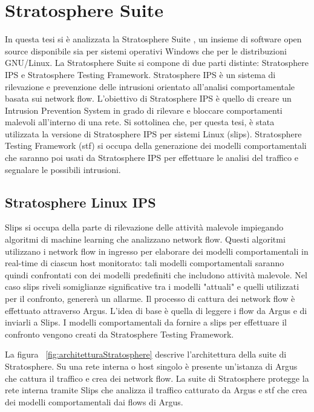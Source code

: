 \documentclass[../main.tex]{subfiles}
\begin{document}
\section{Stratosphere Suite}
In questa tesi si è analizzata la Stratosphere Suite \cite{stratosphereSuite}, un insieme di software open source disponibile sia per sistemi operativi Windows che per le distribuzioni GNU/Linux. La Stratosphere Suite si compone di due parti distinte: Stratosphere IPS e Stratosphere Testing Framework.
Stratosphere IPS è un sistema di rilevazione e prevenzione delle intrusioni orientato all'analisi comportamentale basata sui network flow. L'obiettivo di Stratosphere IPS è quello di creare un Intrusion Prevention System in grado di rilevare e bloccare comportamenti malevoli all'interno di una rete. Si sottolinea che, per questa tesi, è stata utilizzata la versione di Stratosphere IPS per sistemi Linux (slips).
Stratosphere Testing Framework (stf) si occupa della generazione dei modelli comportamentali che saranno poi usati da Stratosphere IPS per effettuare le analisi del traffico e segnalare le possibili intrusioni.

\subsection{Stratosphere Linux IPS}
Slips si occupa della parte di rilevazione delle attività malevole impiegando algoritmi di machine learning che analizzano network flow. Questi algoritmi utilizzano i network flow in ingresso per elaborare dei modelli comportamentali in real-time di ciascun host monitorato: tali modelli comportamentali saranno quindi confrontati con dei modelli predefiniti che includono attività malevole. Nel caso slips riveli somiglianze significative tra i modelli "attuali" e quelli utilizzati per il confronto, genererà un allarme. 
Il processo di cattura dei network flow è effettuato attraverso Argus. L'idea di base è quella di leggere i flow da Argus e di inviarli a Slips. I modelli comportamentali da fornire a slips per effettuare il confronto vengono creati da Stratosphere Testing Framework.

La figura ~\ref{fig:architetturaStratosphere} descrive l'architettura della suite di Stratosphere. Su una rete interna o host singolo è presente un'istanza di Argus che cattura il traffico e crea dei network flow. La suite di Stratosphere protegge la rete interna tramite Slips che analizza il traffico catturato da Argus e stf che crea dei modelli comportamentali dai flows di Argus.
\end{document}
